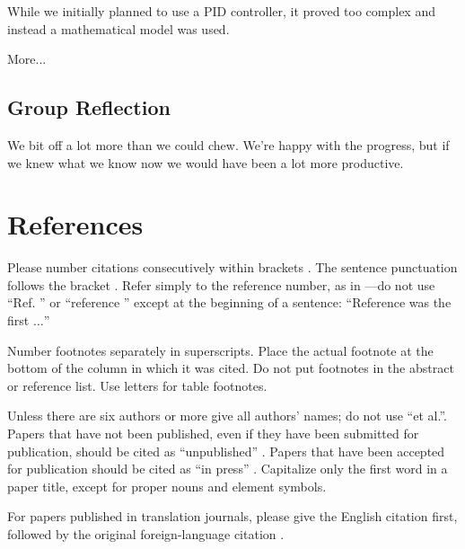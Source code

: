 \documentclass[titlepage]{article}
\begin{document}
While we initially planned to use a PID controller, it proved too complex and instead a mathematical model was used.

More...

\subsection{Group Reflection}

We bit off a lot more than we could chew. We're happy with the progress, but if we knew what we know now we would have been a lot more productive.

\section*{References}

Please number citations consecutively within brackets \cite{b1}. The
sentence punctuation follows the bracket \cite{b2}. Refer simply to the reference
number, as in \cite{b3}---do not use ``Ref. \cite{b3}'' or ``reference \cite{b3}'' except at
the beginning of a sentence: ``Reference \cite{b3} was the first $\ldots$''

Number footnotes separately in superscripts. Place the actual footnote at
the bottom of the column in which it was cited. Do not put footnotes in the
abstract or reference list. Use letters for table footnotes.

Unless there are six authors or more give all authors' names; do not use
``et al.''. Papers that have not been published, even if they have been
submitted for publication, should be cited as ``unpublished'' \cite{b4}. Papers
that have been accepted for publication should be cited as ``in press'' \cite{b5}.
Capitalize only the first word in a paper title, except for proper nouns and
element symbols.

For papers published in translation journals, please give the English
citation first, followed by the original foreign-language citation \cite{b6}.
\end{document}
